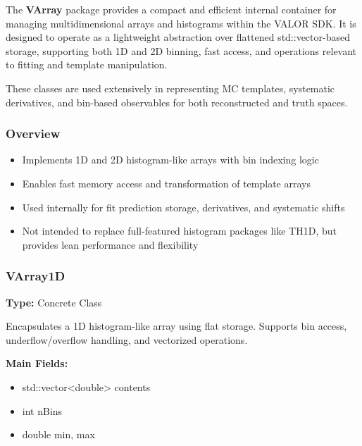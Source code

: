 The {\color{cadmiumgreen} \textbf{VArray}} package provides a compact and efficient internal container for managing multidimensional arrays and histograms within the VALOR SDK.  
It is designed to operate as a lightweight abstraction over flattened {\color{cadmiumgreen} std::vector}-based storage, supporting both 1D and 2D binning, fast access, and operations relevant to fitting and template manipulation.

These classes are used extensively in representing MC templates, systematic derivatives, and bin-based observables for both reconstructed and truth spaces.

\vspace{1em}
\subsubsection*{Overview}

\begin{itemize}
  \item Implements 1D and 2D histogram-like arrays with bin indexing logic
  \item Enables fast memory access and transformation of template arrays
  \item Used internally for fit prediction storage, derivatives, and systematic shifts
  \item Not intended to replace full-featured histogram packages like {\color{cadmiumgreen} TH1D}, but provides lean performance and flexibility
\end{itemize}

\vspace{1em}
\subsubsection*{\color{cadmiumgreen}\bf VArray1D}

\textbf{Type:} Concrete Class

Encapsulates a 1D histogram-like array using flat storage.  
Supports bin access, underflow/overflow handling, and vectorized operations.

\vspace{0.5em}
\noindent\textbf{Main Fields:}

\begin{itemize}
  \item {\color{amber}std::vector<double>} contents
  \item {\color{amber}int} nBins
  \item {\color{amber}double} min, max
\end{itemize}

